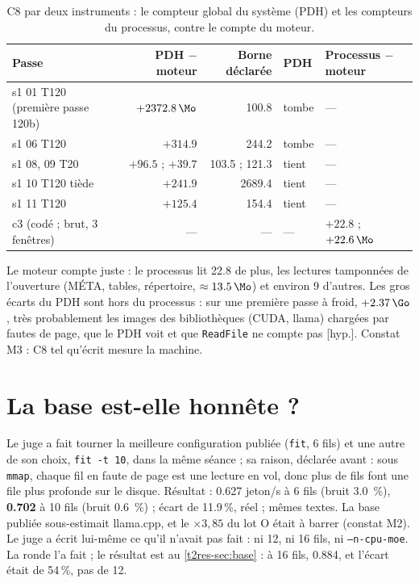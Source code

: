 \begin{table}[ht]
\centering\small
\caption[C8 par deux instruments]{C8 par deux instruments \mes : le compteur global du système (PDH) et les compteurs du processus, contre le compte du moteur.}
\label{t2e-tab:c8}
\begin{tabular}{@{}lrrll@{}}
\toprule
Passe & PDH $-$ moteur & Borne déclarée & PDH & Processus $-$ moteur \\
\midrule
s1 01 T120 (première passe 120b) & $+\SI{2372.8}{\Mo}$ & \num{100.8} & tombe & --- \\
s1 06 T120 & $+\num{314.9}$ & \num{244.2} & tombe & --- \\
s1 08, 09 T20 & $+\num{96.5}$ ; $+\num{39.7}$ & \num{103.5} ; \num{121.3} & tient & --- \\
s1 10 T120 tiède & $+\num{241.9}$ & \num{2689.4} & tient & --- \\
s1 11 T120 & $+\num{125.4}$ & \num{154.4} & tient & --- \\
c3 (codé ; brut, 3 fenêtres) & --- & --- & --- & $+\num{22.8}$ ; $+\SI{22.6}{\Mo}$ \\
\bottomrule
\end{tabular}
\end{table}

Le moteur compte juste : le processus lit \SI{22.8}{\Mo} de plus, les lectures tamponnées de l'ouverture (MÉTA, tables, répertoire, $\approx \SI{13.5}{\Mo}$) et environ \SI{9}{\Mo} d'autres. Les gros écarts du PDH sont hors du processus : sur une première passe à froid, $+\SI{2.37}{\Go}$, très probablement les images des bibliothèques (CUDA, llama) chargées par fautes de page, que le PDH voit et que \texttt{ReadFile} ne compte pas [hyp.]. Constat M3 : C8 tel qu'écrit mesure la machine.

\section{La base est-elle honnête ?}\label{t2e-sec:base}

Le juge a fait tourner la meilleure configuration publiée (\texttt{fit}, 6 fils) et une autre de son choix, \texttt{fit -t 10}, dans la même séance ; sa raison, déclarée avant : sous \texttt{mmap}, chaque fil en faute de page est une lecture en vol, donc plus de fils font une file plus profonde sur le disque. Résultat : \num{0.627} jeton/s à 6 fils (bruit \SI{3.0}{\percent}), \textbf{\num{0.702}} à 10 fils (bruit \SI{0.6}{\percent}) ; écart de \num{11.9}\,\%, réel ; mêmes textes. La base publiée sous-estimait llama.cpp, et le $\times 3{,}85$ du lot O était à barrer (constat M2). Le juge a écrit lui-même ce qu'il n'avait pas fait : ni 12, ni 16 fils, ni \texttt{--n-cpu-moe}. La ronde l'a fait ; le résultat est au \cref{t2res-sec:base} : à 16 fils, \num{0.884}, et l'écart était de \num{54}\,\%, pas de 12.

